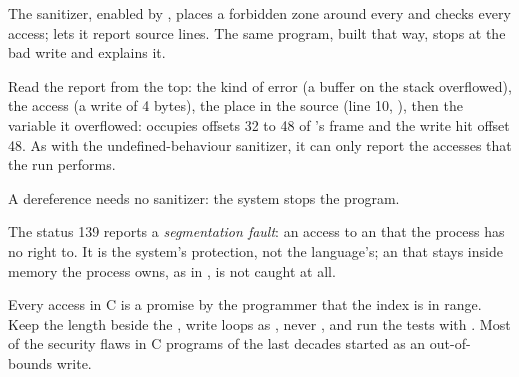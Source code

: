 \label{lst:b1:pointers-and-arrays:neighbour}

\label{out:b1:pointers-and-arrays:neighbour}

The  sanitizer, enabled by , places a forbidden zone around every  and checks
every access;  lets it report source lines. The same program, built that way, stops at the bad write and
explains it.

\label{out:b1:pointers-and-arrays:asan}

Read the report from the top: the kind of error (a buffer on the stack overflowed), the access (a write of 4 bytes),
the place in the source (line 10, ), then the variable it overflowed:  occupies
offsets 32 to 48 of 's frame and the write hit offset 48. As with the undefined-behaviour sanitizer, it
can only report the accesses that the run performs.

A  dereference needs no sanitizer: the system stops the program.

\label{lst:b1:pointers-and-arrays:null}

\label{out:b1:pointers-and-arrays:null}

The status 139 reports a \emph{segmentation fault}: an access to an  that the process has no right to. It is
the system's protection, not the language's; an  that stays inside memory the process owns, as
in , is not caught at all.

\begin{safety}
Every  access in C is a promise by the programmer that the index is in range. Keep the length beside the
, write loops as , never , and run the tests with . Most of
the security flaws in C programs of the last decades started as an out-of-bounds write.
\end{safety}

